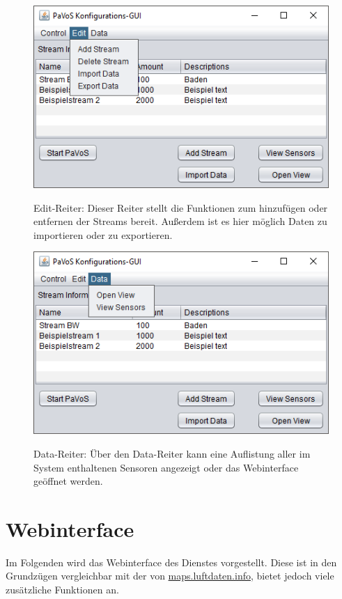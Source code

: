 \begin{figure}[H]
	\centering
		\includegraphics[width=0.6\linewidth]{gui/backend/BackendGUIMenu2.png}\\
	\caption{Edit-Reiter: Dieser Reiter stellt die Funktionen zum hinzufügen oder entfernen der Streams bereit. Außerdem ist es hier möglich Daten zu importieren oder zu exportieren.}
\end{figure}

\begin{figure}[H]
	\centering
		\includegraphics[width=0.6\linewidth]{gui/backend/BackendGUIMenu3.png}\\
	\caption{Data-Reiter: Über den Data-Reiter kann eine Auflistung aller im System enthaltenen Sensoren angezeigt  oder das Webinterface geöffnet werden.}
\end{figure}
\newpage
\section{Webinterface}
Im Folgenden wird das Webinterface des Dienstes vorgestellt. Diese ist in den Grundzügen vergleichbar mit der von \url{maps.luftdaten.info}, bietet jedoch viele zusätzliche Funktionen an.

